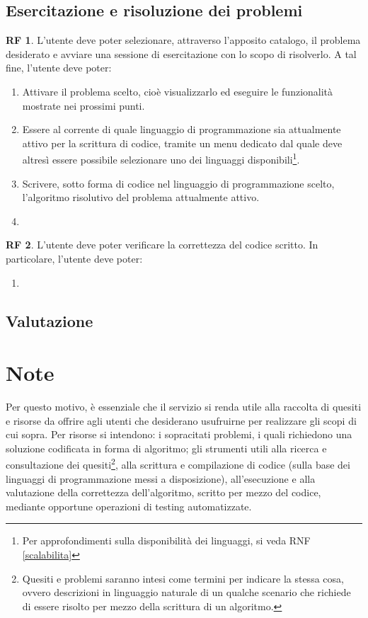 \documentclass[11pt, a4paper]{article}
\theoremstyle{definition}
\newtheorem{funcreq}{RF} %
\begin{document}
\subsection*{Esercitazione e risoluzione dei problemi}
\begin{funcreq}
L'utente deve poter selezionare, attraverso l'apposito catalogo, il problema desiderato e avviare una sessione di esercitazione con lo scopo di risolverlo. A
tal fine, l'utente deve poter:
\begin{enumerate}
    \item Attivare il problema scelto, cioè visualizzarlo ed eseguire le
    funzionalità mostrate nei prossimi punti.
    
    \item Essere al corrente di quale linguaggio di programmazione sia
    attualmente attivo per la scrittura di codice, tramite un menu dedicato
    dal quale deve altresì essere possibile selezionare uno dei linguaggi
    disponibili\footnote{Per approfondimenti sulla disponibilità dei linguaggi, si veda RNF \ref{scalabilita}}.
    
    \item Scrivere, sotto forma di codice nel linguaggio di programmazione
    scelto, l'algoritmo risolutivo del problema attualmente attivo.

    \item 
\end{enumerate}
\end{funcreq}

\begin{funcreq}
L'utente deve poter verificare la correttezza del codice scritto. In
particolare, l'utente deve poter:
\begin{enumerate}
    \item 
\end{enumerate}
\end{funcreq}


\subsection*{Valutazione}


\newpage
\section*{Note}
Per questo motivo, è essenziale che il servizio si renda utile alla
raccolta di quesiti e risorse da offrire agli utenti che desiderano usufruirne
per realizzare gli scopi di cui sopra. Per risorse si intendono: i sopracitati
problemi, i quali richiedono una soluzione codificata in forma di algoritmo;
gli strumenti utili alla ricerca e consultazione dei
quesiti\footnote{Quesiti e problemi saranno intesi come termini per indicare la stessa cosa, ovvero descrizioni in linguaggio
naturale di un qualche scenario che richiede di essere risolto per mezzo
della scrittura di un algoritmo.}, alla scrittura e
compilazione di codice (sulla base dei linguaggi di programmazione
messi a disposizione), all'esecuzione e alla valutazione della
correttezza dell'algoritmo, scritto per mezzo del codice, mediante
opportune operazioni di testing automatizzate.
\end{document}
